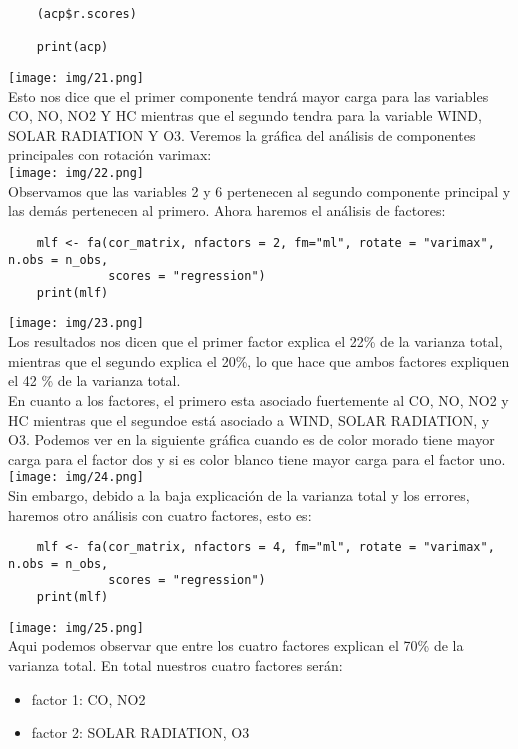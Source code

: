 \begin{sol}
\begin{verbatim}
    (acp$r.scores)
    
    print(acp)
    \end{verbatim}
    \texttt{[image: img/21.png]}\\
	  Esto nos dice que el primer componente tendrá mayor carga para las variables CO, NO, NO2 Y HC mientras que el segundo tendra para la variable WIND, SOLAR RADIATION Y O3. Veremos la gráfica del análisis de componentes principales con rotación varimax:\\
    \texttt{[image: img/22.png]}\\    
    Observamos que las variables 2 y 6 pertenecen al segundo componente principal y las demás pertenecen al primero.
    Ahora haremos el análisis de factores:
\begin{verbatim}
    mlf <- fa(cor_matrix, nfactors = 2, fm="ml", rotate = "varimax", n.obs = n_obs,
              scores = "regression")
    print(mlf)
    \end{verbatim}
    \texttt{[image: img/23.png]}\\
        Los resultados nos dicen que el primer factor explica el 22\% de la varianza total, mientras que el segundo explica el 20\%, lo que hace que ambos factores expliquen el 42 \% de la varianza total.\\ En cuanto a los factores, el primero esta asociado fuertemente al CO, NO, NO2 y HC mientras que el segundoe está asociado a WIND, SOLAR RADIATION, y O3.
    Podemos ver en la siguiente gráfica cuando es de color morado tiene mayor carga para el factor dos y si es color blanco tiene mayor carga para el factor uno.\\
    \texttt{[image: img/24.png]}\\
Sin embargo, debido a la baja explicación de la varianza total y los errores, haremos otro análisis con cuatro factores, esto es:
\begin{verbatim}
    mlf <- fa(cor_matrix, nfactors = 4, fm="ml", rotate = "varimax", n.obs = n_obs,
              scores = "regression")
    print(mlf)
    \end{verbatim}
    \texttt{[image: img/25.png]}\\
Aqui podemos observar que entre los cuatro factores explican el 70\% de la varianza total. En total nuestros cuatro factores serán:
\begin{itemize}
\item factor 1: CO, NO2
\item factor 2: SOLAR RADIATION, O3

\end{itemize}
\end{sol}

